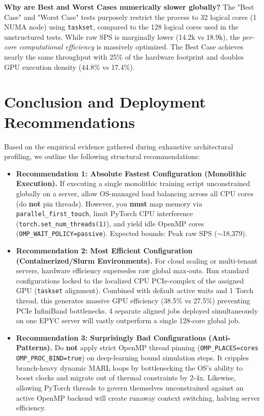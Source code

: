 \documentclass[11pt,a4paper]{article}
\begin{document}
\textbf{Why are Best and Worst Cases numerically slower globally?} 
The "Best Case" and "Worst Case" tests purposely restrict the process to 32 logical cores (1 NUMA node) using \texttt{taskset}, compared to the 128 logical cores used in the unstructured tests. While raw SPS is marginally lower (14.2k vs 18.9k), the \textit{per-core computational efficiency} is massively optimized. The Best Case achieves nearly the same throughput with 25\% of the hardware footprint and doubles GPU execution density (44.8\% vs 17.4\%). 

\section{Conclusion and Deployment Recommendations}

Based on the empirical evidence gathered during exhaustive architectural profiling, we outline the following structural recommendations:

\begin{itemize}
    \item \textbf{Recommendation 1: Absolute Fastest Configuration (Monolithic Execution).} 
    If executing a single monolithic training script unconstrained globally on a server, allow OS-managed load balancing across all CPU cores (do \textbf{not} pin threads). However, you \textbf{must} map memory via \texttt{parallel\_first\_touch}, limit PyTorch CPU interference (\texttt{torch.set\_num\_threads(1)}), and yield idle OpenMP cores (\texttt{OMP\_WAIT\_POLICY=passive}). Expected bounds: Peak raw SPS ($\sim$18,379).
    
    \item \textbf{Recommendation 2: Most Efficient Configuration (Containerized/Slurm Environments).} 
    For cloud scaling or multi-tenant servers, hardware efficiency supersedes raw global max-outs. Run standard configurations locked to the localized CPU PCIe-complex of the assigned GPU (\texttt{taskset} alignment). Combined with default active waits and 1 Torch thread, this generates massive GPU efficiency (38.5\% vs 27.5\%) preventing PCIe InfiniBand bottlenecks. 4 separate aligned jobs deployed simultaneously on one EPYC server will vastly outperform a single 128-core global job.
    
    \item \textbf{Recommendation 3: Surprisingly Bad Configurations (Anti-Patterns).} 
    Do \textbf{not} apply strict OpenMP thread pinning (\texttt{OMP\_PLACES=cores OMP\_PROC\_BIND=true}) on deep-learning bound simulation steps. It cripples branch-heavy dynamic MARL loops by bottlenecking the OS's ability to boost clocks and migrate out of thermal constraints by 2-4x. Likewise, allowing PyTorch threads to govern themselves unconstrained against an active OpenMP backend will create runaway context switching, halving server efficiency.
\end{itemize}
\end{document}
